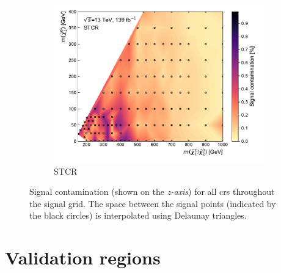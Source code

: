 \begin{figure}
\begin{subfigure}[b]{0.5\linewidth}
		\centering\includegraphics[width=1.0\textwidth]{signal_contamination/plot_STCR}
		\caption{STCR\label{fig:signal_contaminations_STCR}}
	\end{subfigure}\hfill

	\caption{Signal contamination (shown on the \textit{z-axis}) for all \glspl{cr} throughout the signal grid. The space between the signal points (indicated by the black circles) is interpolated using Delaunay triangles.}
	\label{fig:signal_contamination_CR}
\end{figure}


\section{Validation regions}


